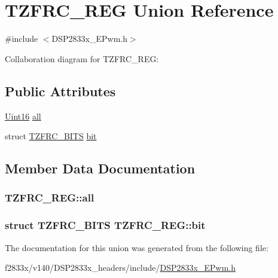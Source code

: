 \hypertarget{union_t_z_f_r_c___r_e_g}{}\section{T\+Z\+F\+R\+C\+\_\+\+R\+E\+G Union Reference}
\label{union_t_z_f_r_c___r_e_g}


{\ttfamily \#include $<$D\+S\+P2833x\+\_\+\+E\+Pwm.\+h$>$}



Collaboration diagram for T\+Z\+F\+R\+C\+\_\+\+R\+E\+G\+:
\subsection*{Public Attributes}
\begin{DoxyCompactItemize}
\item 
\hyperlink{_d_s_p2833x___device_8h_a59a9f6be4562c327cbfb4f7e8e18f08b}{Uint16} \hyperlink{union_t_z_f_r_c___r_e_g_ab2e66514a19e53fa53312c1140e1bad5}{all}
\item 
struct \hyperlink{struct_t_z_f_r_c___b_i_t_s}{T\+Z\+F\+R\+C\+\_\+\+B\+I\+T\+S} \hyperlink{union_t_z_f_r_c___r_e_g_aca2bd644b07f92ceb7ab8b4a21b7ed2e}{bit}
\end{DoxyCompactItemize}


\subsection{Member Data Documentation}
\hypertarget{union_t_z_f_r_c___r_e_g_ab2e66514a19e53fa53312c1140e1bad5}{}
\subsubsection[{all}]{ T\+Z\+F\+R\+C\+\_\+\+R\+E\+G\+::all}\label{union_t_z_f_r_c___r_e_g_ab2e66514a19e53fa53312c1140e1bad5}
\hypertarget{union_t_z_f_r_c___r_e_g_aca2bd644b07f92ceb7ab8b4a21b7ed2e}{}
\subsubsection[{bit}]{\setlength{\rightskip}{0pt plus 5cm}struct {\bf T\+Z\+F\+R\+C\+\_\+\+B\+I\+T\+S} T\+Z\+F\+R\+C\+\_\+\+R\+E\+G\+::bit}\label{union_t_z_f_r_c___r_e_g_aca2bd644b07f92ceb7ab8b4a21b7ed2e}


The documentation for this union was generated from the following file\+:\begin{DoxyCompactItemize}
\item 
f2833x/v140/\+D\+S\+P2833x\+\_\+headers/include/\hyperlink{_d_s_p2833x___e_pwm_8h}{D\+S\+P2833x\+\_\+\+E\+Pwm.\+h}\end{DoxyCompactItemize}
